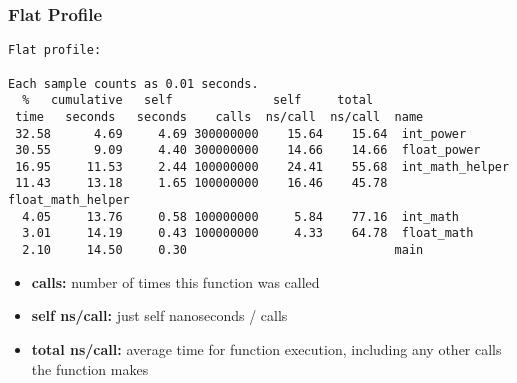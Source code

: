 \begin{frame}[fragile]
  \frametitle{Flat Profile}


\large
\begin{changemargin}{1.5cm}
  \begin{lstlisting}[basicstyle=\tiny]
Flat profile:

Each sample counts as 0.01 seconds.
  %   cumulative   self              self     total           
 time   seconds   seconds    calls  ns/call  ns/call  name    
 32.58      4.69     4.69 300000000    15.64    15.64  int_power
 30.55      9.09     4.40 300000000    14.66    14.66  float_power
 16.95     11.53     2.44 100000000    24.41    55.68  int_math_helper
 11.43     13.18     1.65 100000000    16.46    45.78  float_math_helper
  4.05     13.76     0.58 100000000     5.84    77.16  int_math
  3.01     14.19     0.43 100000000     4.33    64.78  float_math
  2.10     14.50     0.30                             main
  \end{lstlisting}


  \begin{itemize}
    \item {\bf calls:} number of times this function was called
    \item {\bf self ns/call:} just self nanoseconds / calls
    \item {\bf total ns/call:} average time for function execution, including
      any other calls the function makes
  \end{itemize}
  \end{changemargin}
\end{frame}

